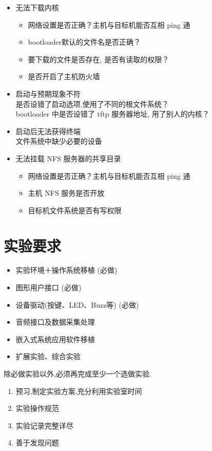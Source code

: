 \begin{itemize}
  \item 无法下载内核
  \begin{itemize}
	\item 网络设置是否正确？主机与目标机能否互相 ping 通
	\item bootloader默认的文件名是否正确？
	\item 要下载的文件是否存在, 是否有读取的权限？
	\item 是否开启了主机防火墙
\end{itemize}
\end{itemize}
\endslide

\begin{itemize}
  \item 启动与预期现象不符\\
		是否设错了启动选项,使用了不同的根文件系统？\\
		bootloader 中是否设错了 tftp 服务器地址, 用了别人的内核？
  \item 启动后无法获得终端\\
		文件系统中缺少必要的设备
  \item 无法挂载 NFS 服务器的共享目录
  \begin{itemize}
	\item 网络设置是否正确？主机与目标机能否互相 ping 通
	\item 主机 NFS 服务是否开放
	\item 目标机文件系统是否有写权限
  \end{itemize}
\end{itemize}
\endslide

\chapter{实验要求}{}
\begin{itemize}
  \item 实验环境＋操作系统移植 ({\red 必做})
  \item 图形用户接口 ({\red 必做})
  \item 设备驱动(按键、LED、Buzz等) ({\red 必做})
  \item 音频接口及数据采集处理
  \item 嵌入式系统应用软件移植
  \item 扩展实验、综合实验
\end{itemize}
除必做实验以外,必须再完成至少一个选做实验.
\endslide

\begin{enumerate}
  \item 预习,制定实验方案,充分利用实验室时间
  \item 实验操作规范
  \item 实验记录完整详尽
  \item 善于发现问题
\end{enumerate}
\endslide

